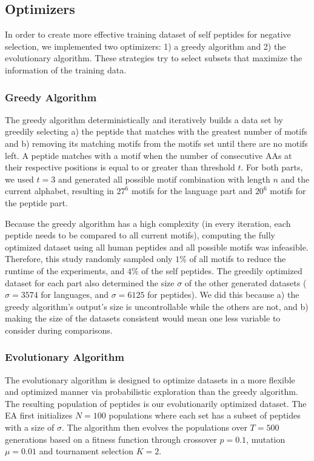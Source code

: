 \documentclass{article}
\begin{document}
\subsection{Optimizers} \label{optimizers}

In order to create more effective training dataset of self peptides for negative selection, we implemented two optimizers: 
1) a greedy algorithm and 2) the evolutionary algorithm. These strategies try to select subsets that maximize the information of the training data.


\subsubsection{Greedy Algorithm}

The greedy algorithm deterministically and iteratively builds a data set by greedily selecting a) the peptide that matches with the greatest number of motifs and b) removing its matching motifs from the motifs set until there are no motifs left.
A peptide matches with a motif when the number of consecutive AAs at their respective positions is equal to or greater than threshold $t$.
For both parts, we used $t=3$ and generated all possible motif combination with length $n$ and the current alphabet, resulting in $27^6$ motifs for the language part and $20^6$ motifs for the peptide part.

Because the greedy algorithm has a high complexity (in every iteration, each peptide needs to be compared to all current motifs), computing the fully optimized dataset using all human peptides and all possible motifs was infeasible.
Therefore, this study randomly sampled only $1\%$ of all motifs to reduce the runtime of the experiments, and $4\%$ of the self peptides.
The greedily optimized dataset for each part also determined the size $\sigma$ of the other generated datasets ($\sigma=3574$ for languages, and $\sigma=6125$ for peptides).
We did this because a) the greedy algorithm's output's size is uncontrollable while the others are not, and b) making the size of the datasets consistent would mean one less variable to consider during comparisons.

\subsubsection{Evolutionary Algorithm} 

The evolutionary algorithm is designed to optimize datasets in a more flexible and optimized manner via probabilistic exploration than the greedy algorithm.
The resulting population of peptides is our evolutionarily optimized dataset.
The EA first initializes $N=100$ populations where each set has a subset of peptides with a size of $\sigma$. 
The algorithm then evolves the populations over $T=500$ generations based on a fitness function through crossover $p=0.1$, mutation $\mu=0.01$ and tournament selection $K=2$.
\end{document}
